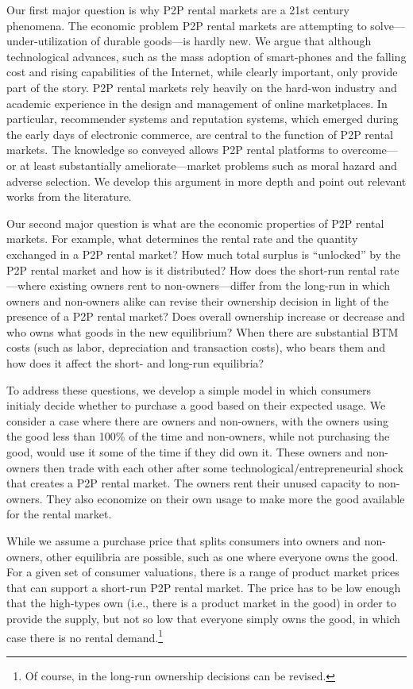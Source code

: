 \documentclass[11pt]{article}
\begin{document}
Our first major question is why P2P rental markets are a 21st century phenomena.
The economic problem P2P rental markets are attempting to solve---under-utilization of durable goods---is hardly new.  
We argue that although technological advances, such as the mass adoption of smart-phones and the falling cost and rising capabilities of the Internet, while clearly important, only provide part of the story. 
P2P rental markets rely heavily on the hard-won industry and academic experience in the design and management of online marketplaces.
In particular, recommender systems and reputation systems, which emerged during the early days of electronic commerce, are central to the function of P2P rental markets. 
The knowledge so conveyed allows P2P rental platforms to overcome---or at least substantially ameliorate---market problems such as moral hazard and adverse selection.  
We develop this argument in more depth and point out relevant works from the literature. 

Our second major question is what are the economic properties of P2P rental markets. 
For example, what determines the rental rate and the quantity exchanged in a P2P rental market? 
How much total surplus is ``unlocked'' by the P2P rental market and how is it distributed? 
How does the short-run rental rate---where existing owners rent to non-owners---differ from the long-run in which owners and non-owners alike can revise their ownership decision in light of the presence of a P2P rental market?
Does overall ownership increase or decrease and who owns what goods in the new equilibrium?
When there are substantial BTM costs (such as labor, depreciation and transaction costs), who bears them and how does it affect the short- and long-run equilibria? 

To address these questions, we develop a simple model in which consumers initialy decide whether to purchase a good based on their expected usage.
We consider a case where there are owners and non-owners, with the owners using the good less than 100\% of the time and non-owners, while not purchasing the good, would use it some of the time if they did own it. 
These owners and non-owners then trade with each other after some technological/entrepreneurial shock that creates a P2P rental market.
The owners rent their unused capacity to non-owners.
They also economize on their own usage to make more the good available for the rental market.

While we assume a purchase price that splits consumers into owners and non-owners, other equilibria are possible, such as one where everyone owns the good.
For a given set of consumer valuations, there is a range of product market prices that can support a short-run P2P rental market.
The price has to be low enough that the high-types own (i.e., there is a product market in the good) in order to provide the supply, but not so low that everyone simply owns the good, in which case there is no rental demand.\footnote{
  Of course, in the long-run ownership decisions can be revised.
}   
\end{document}
